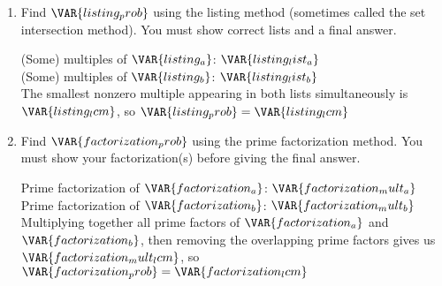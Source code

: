 
\begin{enumerate}

    \item Find $\VAR{listing_prob}$ using the listing method (sometimes called the set intersection method). You must show correct lists and a final answer.

    \vfill

    \begin{ansenv}
        (Some) multiples of $\VAR{listing_a}$: $\VAR{listing_list_a}$\\

        (Some) multiples of $\VAR{listing_b}$: $\VAR{listing_list_b}$\\

        The smallest nonzero multiple appearing in both lists simultaneously is $\VAR{listing_lcm}$, so $\VAR{listing_prob} = \VAR{listing_lcm}$
    \end{ansenv}

    \vfill

    \item Find $\VAR{factorization_prob}$ using the prime factorization method. You must show your factorization(s) before giving the final answer.

    \vfill

    \begin{ansenv}
        Prime factorization of $\VAR{factorization_a}$: $\VAR{factorization_mult_a}$\\

        Prime factorization of $\VAR{factorization_b}$: $\VAR{factorization_mult_b}$\\

        Multiplying together all prime factors of $\VAR{factorization_a}$ and $\VAR{factorization_b}$, then removing the overlapping prime factors gives us $\VAR{factorization_mult_lcm}$, so $\VAR{factorization_prob} = \VAR{factorization_lcm}$
    \end{ansenv}

    \vfill

\end{enumerate}

\trueemptypage